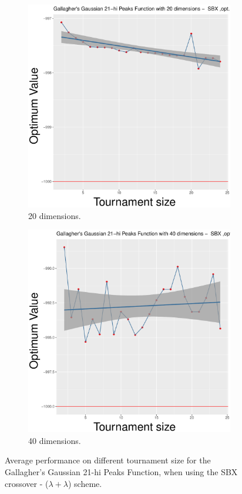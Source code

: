 \begin{figure}[t]
\begin{subfigure}[b]{0.33\textwidth}
		\includegraphics[width=\textwidth]{img/2n2n-20D/multimodal_2n2n_22_dim_20.pdf}
		\caption{20 dimensions.}
	\end{subfigure}
	\begin{subfigure}[b]{0.33\textwidth}
		\centering
		\includegraphics[width=\textwidth]{img/2n2n-40D/multimodal_2n2n_22_dim_40.pdf}
		\caption{40 dimensions.}
	\end{subfigure}
	\caption{Average performance on different tournament size for the Gallagher's Gaussian 21-hi Peaks Function, when using the SBX crossover - ($\lambda + \lambda$) scheme.}
	\label{sbx-22-B}
\end{figure}

